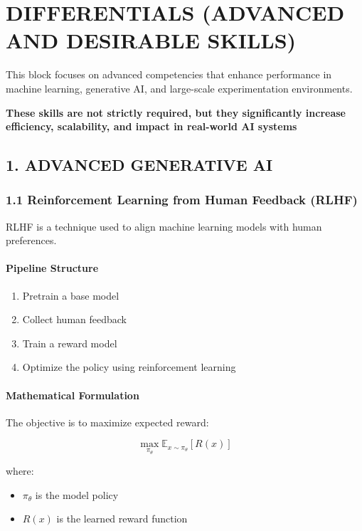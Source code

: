 \chapter{DIFFERENTIALS (ADVANCED AND DESIRABLE SKILLS)}

This block focuses on advanced competencies that enhance performance in machine learning, generative AI, and large-scale experimentation environments.

\begin{center}
\textbf{These skills are not strictly required, but they significantly increase efficiency, scalability, and impact in real-world AI systems}
\end{center}

\vspace{0.5cm}

\section*{1. ADVANCED GENERATIVE AI}

\subsection*{1.1 Reinforcement Learning from Human Feedback (RLHF)}

RLHF is a technique used to align machine learning models with human preferences.

\subsubsection*{Pipeline Structure}

\begin{enumerate}
\item Pretrain a base model
\item Collect human feedback
\item Train a reward model
\item Optimize the policy using reinforcement learning
\end{enumerate}

\subsubsection*{Mathematical Formulation}

The objective is to maximize expected reward:

\[
\max_{\pi_\theta} \mathbb{E}_{x \sim \pi_\theta} [R(x)]
\]

where:
\begin{itemize}
\item $\pi_\theta$ is the model policy
\item $R(x)$ is the learned reward function
\end{itemize}

